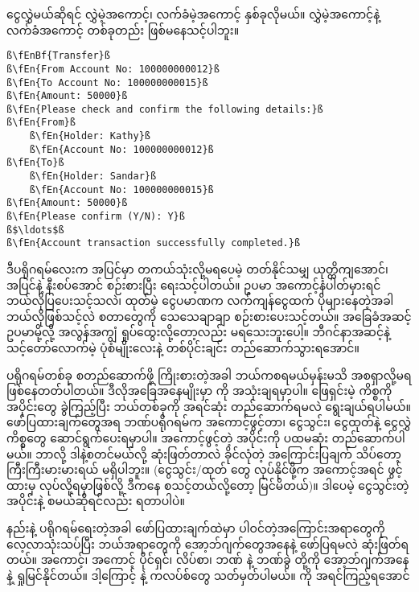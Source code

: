 ငွေလွှဲမယ်ဆိုရင် လွှဲမဲ့အကောင့်၊ လက်ခံမဲ့အကောင့် နှစ်ခုလိုမယ်။ လွှဲမဲ့အကောင့်နဲ့ လက်ခံအကောင့် တစ်ခုတည်း ဖြစ်မနေသင့်ပါဘူး။ 
%
\begin{verbatim}
ß\fEnBf{Transfer}ß
ß\fEn{From Account No: 100000000012}ß
ß\fEn{To Account No: 100000000015}ß
ß\fEn{Amount: 50000}ß
ß\fEn{Please check and confirm the following details:}ß
ß\fEn{From}ß
    ß\fEn{Holder: Kathy}ß
    ß\fEn{Account No: 100000000012}ß
ß\fEn{To}ß
    ß\fEn{Holder: Sandar}ß
    ß\fEn{Account No: 100000000015}ß
ß\fEn{Amount: 50000}ß
ß\fEn{Please confirm (Y/N): Y}ß 
ß$\ldots$ß
ß\fEn{Account transaction successfully completed.}ß
\end{verbatim}
%

ဒီပရိုဂရမ်လေးက အပြင်မှာ တကယ်သုံးလို့မရပေမဲ့ တတ်နိုင်သမျှ ယုတ္တိကျအောင်၊ အပြင်နဲ့ နီးစပ်အောင် စဉ်းစားပြီး ရေးသင့်ပါတယ်။ ဥပမာ အကောင့်နံပါတ်မှားရင် ဘယ်လိုပြပေးသင့်သလဲ၊ ထုတ်မဲ့ ငွေပမာဏက လက်ကျန်ငွေထက် ပိုများနေတဲ့အခါ ဘယ်လိုဖြစ်သင့်လဲ စတာတွေကို သေသေချာချာ စဉ်းစားပေးသင့်တယ်။ အခြေခံအဆင့် ဥပမာမို့လို့ အလွန်အကျွံ ရှုပ်ထွေးလို့တော့လည်း မရသေးဘူးပေါ့။ ဘီဂင်နာအဆင့်နဲ့ သင့်တော်လောက်မဲ့ ပုံစံမျိုးလေးနဲ့ တစ်ပိုင်းချင်း တည်ဆောက်သွားရအောင်။

ပရိုဂရမ်တစ်ခု စတည်ဆောက်ဖို့ ကြိုးစားတဲ့အခါ ဘယ်ကစရမယ်မှန်းမသိ အစရှာလို့မရ ဖြစ်နေတတ်ပါတယ်။ ဒီလိုအခြေအနေမျိုးမှာ  ကို အသုံးချရမှာပါ။ ဖြေရှင်းမဲ့ ကိစ္စကို အပိုင်းတွေ ခွဲကြည့်ပြီး ဘယ်တစ်ခုကို အရင်ဆုံး တည်ဆောက်ရမလဲ ရွေးချယ်ရပါမယ်။ ဖော်ပြထားချက်တွေအရ ဘဏ်ပရိုဂရမ်က အကောင့်ဖွင့်တာ၊ ငွေသွင်း၊ ငွေထုတ်နဲ့ ငွေလွှဲ ကိစ္စတွေ ဆောင်ရွက်ပေးရမှာပါ။ အကောင့်ဖွင့်တဲ့ အပိုင်းကို ပထမဆုံး တည်ဆောက်ပါမယ်။ ဘာလို့ ဒါနဲ့စတင်မယ်လို့ ဆုံးဖြတ်တာလဲ ခိုင်လုံတဲ့ အကြောင်းပြချက် သိပ်တော့ကြီးကြီးမားမားရယ် မရှိပါဘူး။ (ငွေသွင်း/ထုတ် တွေ လုပ်နိုင်ဖို့က အကောင့်အရင် ဖွင့်ထားမှ လုပ်လို့ရမှာဖြစ်လို့ ဒီကနေ စသင့်တယ်လို့တော့ မြင်မိတယ်)။ ဒါပေမဲ့ ငွေသွင်းတဲ့အပိုင်းနဲ့ စမယ်ဆိုရင်လည်း ရတာပါပဲ။ 

 နည်းနဲ့ ပရိုဂရမ်ရေးတဲ့အခါ ဖော်ပြထားချက်ထဲမှာ ပါဝင်တဲ့အကြောင်းအရာတွေကို လေ့လာသုံးသပ်ပြီး ဘယ်အရာတွေကို အော့ဘ်ဂျက်တွေအနေနဲ့ ဖော်ပြရမလဲ ဆုံးဖြတ်ရတယ်။ အကောင့်၊ အကောင့် ပိုင်ရှင်၊ လိပ်စာ၊ ဘဏ် နဲ့ ဘဏ်ခွဲ တို့ကို အော့ဘ်ဂျက်အနေနဲ့ ရှုမြင်နိုင်တယ်။ ဒါ့ကြောင့် \fEn{,} \fEn{,} \fEn{,}  နဲ့   ကလပ်စ်တွေ သတ်မှတ်ပါမယ်။  ကို အရင်ကြည့်ရအောင် $\ldots$

